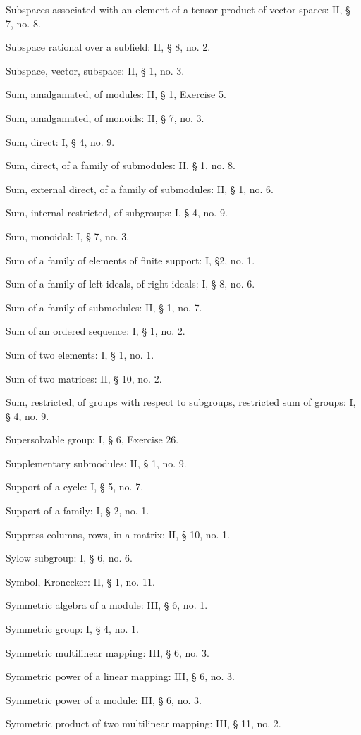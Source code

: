 Subspaces associated with an element of a tensor product of vector spaces: II, § 7, no. 8.

Subspace rational over a subfield: II, § 8, no. 2.

Subspace, vector, subspace: II, § 1, no. 3.

Sum, amalgamated, of modules: II, § 1, Exercise 5.

Sum, amalgamated, of monoids: II, § 7, no. 3.

Sum, direct: I, § 4, no. 9.

Sum, direct, of a family of submodules: II, § 1, no. 8.

Sum, external direct, of a family of submodules: II, § 1, no. 6.

Sum, internal restricted, of subgroups: I, § 4, no. 9.

Sum, monoidal: I, § 7, no. 3.

Sum of a family of elements of finite support: I, §2, no. 1.

Sum of a family of left ideals, of right ideals: I, § 8, no. 6.

Sum of a family of submodules: II, § 1, no. 7.

Sum of an ordered sequence: I, § 1, no. 2.

Sum of two elements: I, § 1, no. 1.

Sum of two matrices: II, § 10, no. 2.

Sum, restricted, of groups with respect to subgroups, restricted sum of groups: I, § 4, no. 9.

Supersolvable group: I, § 6, Exercise 26.

Supplementary submodules: II, § 1, no. 9.

Support of a cycle: I, § 5, no. 7.

Support of a family: I, § 2, no. 1.

Suppress columns, rows, in a matrix: II, § 10, no. 1.

Sylow subgroup: I, § 6, no. 6.

Symbol, Kronecker: II, § 1, no. 11.

Symmetric algebra of a module: III, § 6, no. 1.

Symmetric group: I, § 4, no. 1.

Symmetric multilinear mapping: III, § 6, no. 3.

Symmetric power of a linear mapping: III, § 6, no. 3.

Symmetric power of a module: III, § 6, no. 3.

Symmetric product of two multilinear mapping: III, § 11, no. 2.

